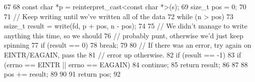 \begin{DoxyCode}
67 {
68     const char *p = reinterpret_cast<const char *>(s);
69     size_t pos = 0;
70 
71     // Keep writing until we've written all of the data
72     while (n > pos) {
73         ssize_t result = write(fd, p + pos, n - pos);
74 
75         // We didn't manage to write anything this time, so we should
76         // probably punt, otherwise we'd just keep spinning
77         if (result == 0)
78             break;
79 
80         // If there was an error, try again on EINTR/EAGAIN, pass the
81         // error up otherwise.
82         if (result == -1) {
83             if (errno == EINTR || errno == EAGAIN)
84                 continue;
85             return result;
86         }
87 
88         pos += result;
89     }
90 
91     return pos;
92 }
\end{DoxyCode}
